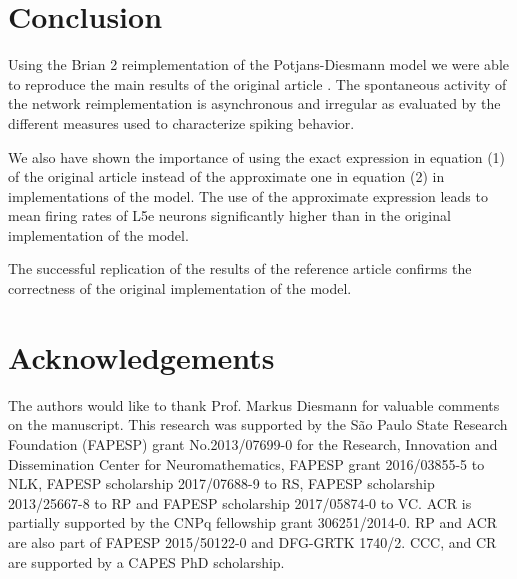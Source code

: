 \documentclass[10pt,a4paper,onecolumn]{article}
\begin{document}
\section{Conclusion}\label{conclusion}
Using the Brian 2 reimplementation of the Potjans-Diesmann model we were able to reproduce the main results of the original article \cite{potjans2014}. The spontaneous activity of the network reimplementation is asynchronous and irregular as evaluated by the different measures used to characterize spiking behavior. 

We also have shown the importance of using the exact expression in equation (1) of the original article instead of the approximate one in equation (2) in implementations of the model. The use of the approximate expression leads to mean firing rates of L5e neurons significantly higher than in the original implementation of the model.  

The successful replication of the results of the reference article confirms the correctness of the original implementation of the model. 

\section{Acknowledgements}\label{acknowledgements}
The authors would like to thank Prof. Markus Diesmann for valuable comments on the manuscript. This research was supported by the S\~{a}o Paulo State Research Foundation (FAPESP) grant No.2013/07699-0 for the Research, Innovation and Dissemination Center for Neuromathematics, FAPESP grant 2016/03855-5 to NLK, FAPESP scholarship 2017/07688-9 to RS, FAPESP scholarship 2013/25667-8 to RP and FAPESP scholarship 2017/05874-0 to VC. ACR is partially supported by the CNPq fellowship grant 306251/2014-0. RP and ACR are also part of FAPESP 2015/50122-0 and DFG-GRTK 1740/2. CCC, and CR are supported by a CAPES PhD scholarship. 

{\sffamily \small
   \printbibliography[title=References]
}
\end{document}
